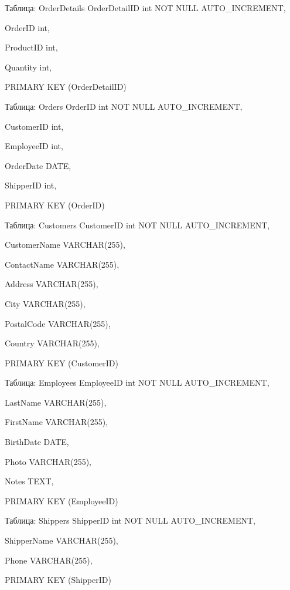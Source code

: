 \documentclass[t, aspectratio=169,xcolor=dvipsnames]{beamer}
\begin{document}
\begin{frame}{Таблица: OrderDetails}
\pause
	OrderDetailID int NOT NULL AUTO\_INCREMENT,
	
	OrderID int,

	ProductID int,

	Quantity int,

	PRIMARY KEY (OrderDetailID)
\end{frame}

\begin{frame}{Таблица: Orders}
\pause	
	OrderID int NOT NULL AUTO\_INCREMENT,
	
	CustomerID int,

	EmployeeID int,

	OrderDate DATE,

	ShipperID int,

	PRIMARY KEY (OrderID)
\end{frame}

\begin{frame}{Таблица: Customers}
\pause	
	CustomerID int NOT NULL AUTO\_INCREMENT,
	
	CustomerName VARCHAR(255),
	
	ContactName VARCHAR(255),
	
	Address VARCHAR(255),
	
	City VARCHAR(255),
	
	PostalCode VARCHAR(255),
	
	Country VARCHAR(255),
	
	PRIMARY KEY (CustomerID)
\end{frame}

\begin{frame}{Таблица: Employees}
\pause	
	EmployeeID int NOT NULL AUTO\_INCREMENT,
	
	LastName VARCHAR(255),
	
	FirstName VARCHAR(255),
	
	BirthDate DATE,
	
	Photo VARCHAR(255),
	
	Notes TEXT,
	
	PRIMARY KEY (EmployeeID)
\end{frame}

\begin{frame}{Таблица: Shippers}
\pause	
	ShipperID int NOT NULL AUTO\_INCREMENT,
	
	ShipperName VARCHAR(255),

	Phone VARCHAR(255),

	PRIMARY KEY (ShipperID)
\end{frame}
\end{document}

